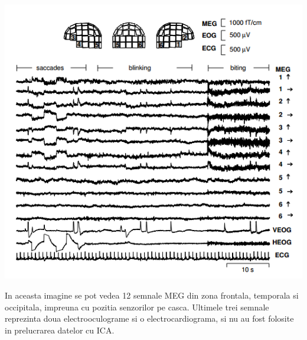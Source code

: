 \documentclass[12pt]{article}
\begin{document}
\begin{center}
	\includegraphics[scale=1]{meg_1}
 \end{center}
 In aceasta imagine se pot vedea 12 semnale MEG din zona frontala, temporala si occipitala, impreuna cu pozitia senzorilor pe casca. Ultimele trei semnale reprezinta doua electrooculograme si o electrocardiograma, si nu au fost folosite in prelucrarea datelor cu ICA.
\end{document}
